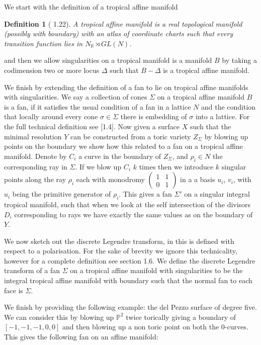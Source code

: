 \documentclass[12pt]{amsbook}
\theoremstyle{plain}
\newtheorem{dfn}[thm]{Definition}
\newcommand{\mb}[1]{\mathbb{#1}}
\begin{document}
We start with the definition of a tropical affine manifold
\begin{dfn}[\cite{GrossBook} 1.22]
A tropical affine manifold is a real topological manifold (possibly with boundary) with an atlas of coordinate charts such that every transition function lies in $N_\mb{R} \rtimes GL(N)$.
\end{dfn}
and then we allow singularities on a tropical manifold is a manifold $B$ by taking a codimension two or more locus $\Delta$ such that $B-\Delta$ is a tropical affine manifold.

We finish by extending the definition of a fan to lie on tropical affine manifolds with singularities. We say a collection of cones $\Sigma$ on a tropical affine manifold $B$ is a fan, if it satisfies the usual condition of a fan in a lattice $N$ and the condition that locally around every cone $\sigma \in \Sigma$ there is embedding of $\sigma$ into a lattice. For the full technical definition see \cite{GrossBook}[1.4]. Now given a surface $X$ such that the minimal resolution $Y$ can be constructed from a toric variety $Z_\Sigma$ by blowing up points on the boundary we show how this related to a fan on a tropical affine manifold. Denote by $C_i$ a curve in the boundary of $Z_\Sigma$, and $\rho_i \in N$ the corresponding  ray in $\Sigma$. If we blow up $C_i$ $k$ times then we introduce $k$ singular points along the ray $\rho_i$ each with monodromy $\begin{pmatrix} 1 & 1 \\ 0 & 1 \end{pmatrix}$ in a a basis $u_i$, $v_i$, with $u_i$ being the primitive generator of $\rho_i$. This gives a fan $\Sigma'$ on a singular integral tropical manifold, such that when we look at the self intersection of the divisors $D_i$ corresponding to rays we have exactly the same values as on the boundary of $Y$. %

We now sketch out the discrete Legendre transform, in \cite{GrossBook} this is defined with respect to a polarisation. For the sake of brevity we ignore this technicality, however for a complete definition see \cite{GrossBook} section 1.6. We define the discrete Legendre transform of a fan $\Sigma$ on a tropical affine manifold with singularities to be the integral tropical affine manifold with boundary such that the normal fan to each face is $\Sigma$.

We finish by providing the following example: the del Pezzo surface of degree five. We can consider this by blowing up $\mb{P}^2$ twice torically giving a boundary of $[-1, -1, -1, 0,0]$ and then blowing up a non toric point on both the $0$-curves. This gives the following fan on an affine manifold:



 
\end{document}
